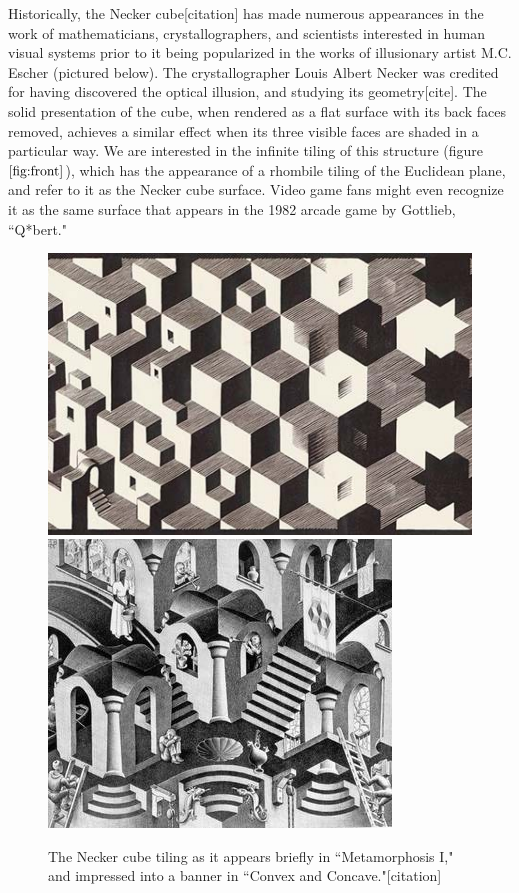 \documentclass[]{article}
\begin{document}
Historically, the Necker cube[citation] has made numerous appearances in the work of mathematicians, crystallographers, and scientists interested in human visual systems prior to it being popularized in the works of illusionary artist M.C. Escher (pictured below). The crystallographer Louis Albert Necker was credited for having discovered the optical illusion, and studying its geometry[cite]. The solid presentation of the cube, when rendered as a flat surface with its back faces removed, achieves a similar effect when its three visible faces are shaded in a particular way. We are interested in the infinite tiling of this structure (figure $\ref{fig:front}$), which has the appearance of a rhombile tiling of the Euclidean plane, and refer to it as the Necker cube surface.  Video game fans might even recognize it as the same surface that appears in the 1982 arcade game by Gottlieb, ``Q*bert." 

\begin{figure}[H]
\begin{center}
\includegraphics[scale=0.4]{escher.jpg}
\includegraphics[scale=0.55]{escher2.jpg}
\caption{The Necker cube tiling as it appears briefly in ``Metamorphosis I," and impressed into a banner in ``Convex and Concave."[citation]}
\label{fig:Escher}
\end{center}
\end{figure}
\end{document}
